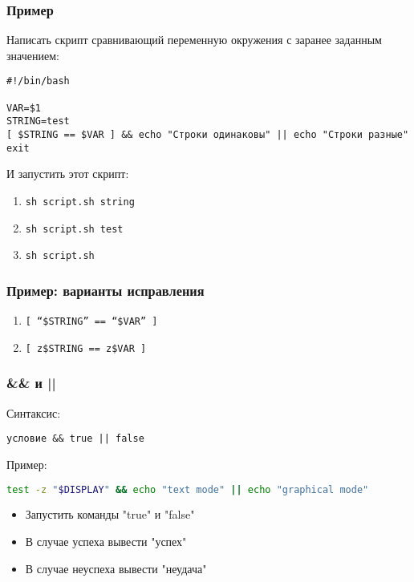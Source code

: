 \begin{frame}[fragile]
\frametitle{Пример}

	Написать скрипт сравнивающий переменную окружения с заранее заданным значением:
	
	\small\begin{lstlisting}
#!/bin/bash

VAR=$1
STRING=test
[ $STRING == $VAR ] && echo "Строки одинаковы" || echo "Строки разные"
exit
	\end{lstlisting}
    \normalsize
	И запустить этот скрипт:
	
	\begin{enumerate}
		\item {\tt sh script.sh string}
		\item {\tt sh script.sh test}
		\item {\tt sh script.sh}
	\end{enumerate}

\end{frame}

\begin{frame}
	\frametitle{Пример: варианты исправления}

		\begin{enumerate}
			\item {\tt [ ``\$STRING'' == ``\$VAR'' ] }
			\item {\tt [ z\$STRING == z\$VAR ] }
		\end{enumerate}

\end{frame}

\begin{frame}[fragile]
\frametitle{\&\& и ||}
	Синтаксис:
\begin{verbatim}
условие && true || false
\end{verbatim}

	\pause
	Пример:
\begin{lstlisting}[language=bash]
test -z "$DISPLAY" && echo "text mode" || echo "graphical mode"
\end{lstlisting}
	
	\pause

	\begin{itemize}
	    \item Запустить команды "true" и "false"
	    \item В случае успеха вывести "успех"
	    \item В случае неуспеха вывести "неудача"
	\end{itemize}
\end{frame}

